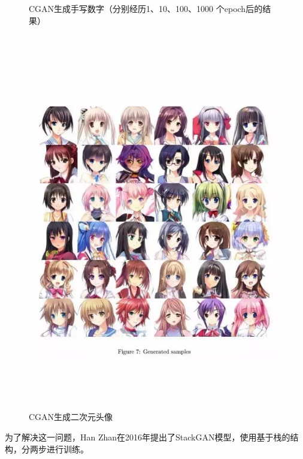 \begin{figure}[htbp]
\begin{minipage}[c]{0.6\textwidth}
\begin{minipage}[c]{1\textwidth}
    \end{minipage}
  \caption{CGAN生成手写数字（分别经历1、10、100、1000 个epoch后的结果）} %
  \label{fig:cgan手写数字} 
  \end{minipage}
  \hfill 
  \begin{minipage}[c]{0.3\textwidth} 
  \centering%
  \centerline{\includegraphics[width=1\textwidth]{figures/moegirl.jpg}}
  \caption{CGAN生成二次元头像} 
  \label{fig:萌娘} 
  \end{minipage} 
  \end{figure}

  为了解决这一问题，Han Zhan在2016年提出了StackGAN模型，使用基于栈的结构，分两步进行训练。
  
